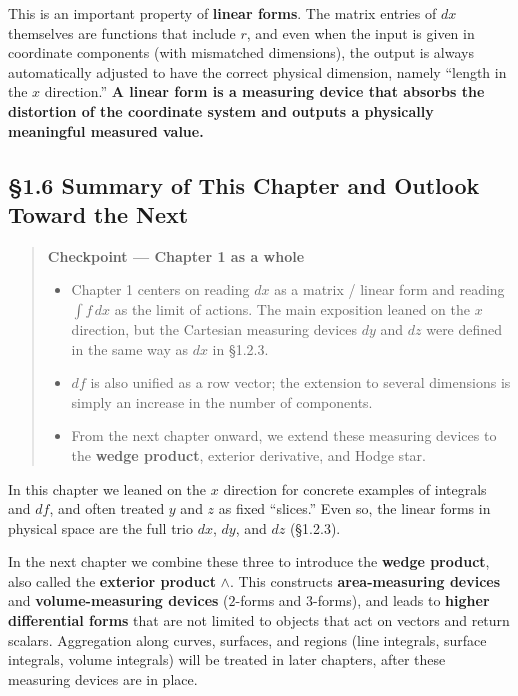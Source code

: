 \documentclass[a4paper,12pt,openany]{book}
\begin{document}
This is an important property of \textbf{linear forms}. The matrix
entries of \(dx\) themselves are functions that include \(r\), and even
when the input is given in coordinate components (with mismatched
dimensions), the output is always automatically adjusted to have the
correct physical dimension, namely ``length in the \(x\) direction.''
\textbf{A linear form is a measuring device that absorbs the distortion
of the coordinate system and outputs a physically meaningful measured
value.}

\par\vspace{0.35em}\par

\hypertarget{summary-of-this-chapter-and-outlook-toward-the-next}{%
\subsection{§1.6 Summary of This Chapter and Outlook Toward the
Next}\label{summary-of-this-chapter-and-outlook-toward-the-next}}

\begin{quote}
\textbf{Checkpoint — Chapter 1 as a whole}

\begin{itemize}
\item
  Chapter 1 centers on reading \(dx\) as a matrix / linear form and
  reading \(\int f\,dx\) as the limit of actions. The main exposition
  leaned on the \(x\) direction, but the Cartesian measuring devices
  \(dy\) and \(dz\) were defined in the same way as \(dx\) in §1.2.3.
\item
  \(df\) is also unified as a row vector; the extension to several
  dimensions is simply an increase in the number of components.
\item
  From the next chapter onward, we extend these measuring devices to the
  \textbf{wedge product}, exterior derivative, and Hodge star.
\end{itemize}
\end{quote}

In this chapter we leaned on the \(x\) direction for concrete examples
of integrals and \(df\), and often treated \(y\) and \(z\) as fixed
``slices.'' Even so, the linear forms in physical space are the full
trio \(dx\), \(dy\), and \(dz\) (§1.2.3).

In the next chapter we combine these three to introduce the
\textbf{wedge product}, also called the \textbf{exterior product}
\(\wedge\). This constructs \textbf{area-measuring devices} and
\textbf{volume-measuring devices} (\(2\)-forms and \(3\)-forms), and
leads to \textbf{higher differential forms} that are not limited to
objects that act on vectors and return scalars. Aggregation along
curves, surfaces, and regions (line integrals, surface integrals, volume
integrals) will be treated in later chapters, after these measuring
devices are in place.
\end{document}
